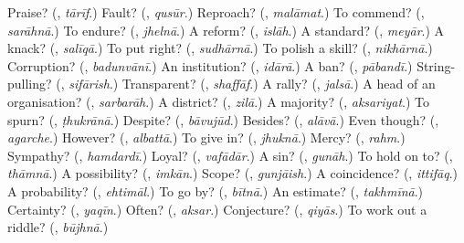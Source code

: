 \begin{tcolorbox}[breakable,colback=teal!4,colframe=teal!35!black,title={Before you move on}]
Praise? (\textbf{}, \emph{tārīf}.) Fault? (\textbf{}, \emph{qusūr}.) Reproach? (\textbf{}, \emph{malāmat}.) To commend? (\textbf{}, \emph{sarāhnā}.) To endure? (\textbf{}, \emph{jhelnā}.) A reform? (\textbf{}, \emph{islāh}.) A standard? (\textbf{}, \emph{meyār}.) A knack? (\textbf{}, \emph{salīqā}.) To put right? (\textbf{}, \emph{sudhārnā}.) To polish a skill? (\textbf{}, \emph{nikhārnā}.) Corruption? (\textbf{}, \emph{badunvānī}.) An institution? (\textbf{}, \emph{idārā}.) A ban? (\textbf{}, \emph{pābandī}.) String-pulling? (\textbf{}, \emph{sifārish}.) Transparent? (\textbf{}, \emph{shaffāf}.) A rally? (\textbf{}, \emph{jalsā}.) A head of an organisation? (\textbf{}, \emph{sarbarāh}.) A district? (\textbf{}, \emph{zilā}.) A majority? (\textbf{}, \emph{aksariyat}.) To spurn? (\textbf{}, \emph{ṭhukrānā}.) Despite? (\textbf{}, \emph{bāvujūd}.) Besides? (\textbf{}, \emph{alāvā}.) Even though? (\textbf{}, \emph{agarche}.) However? (\textbf{}, \emph{albattā}.) To give in? (\textbf{}, \emph{jhuknā}.) Mercy? (\textbf{}, \emph{rahm}.) Sympathy? (\textbf{}, \emph{hamdardī}.) Loyal? (\textbf{}, \emph{vafādār}.) A sin? (\textbf{}, \emph{gunāh}.) To hold on to? (\textbf{}, \emph{thāmnā}.) A possibility? (\textbf{}, \emph{imkān}.) Scope? (\textbf{}, \emph{gunjāish}.) A coincidence? (\textbf{}, \emph{ittifāq}.) A probability? (\textbf{}, \emph{ehtimāl}.) To go by? (\textbf{}, \emph{bītnā}.) An estimate? (\textbf{}, \emph{takhmīnā}.) Certainty? (\textbf{}, \emph{yaqīn}.) Often? (\textbf{}, \emph{aksar}.) Conjecture? (\textbf{}, \emph{qiyās}.) To work out a riddle? (\textbf{}, \emph{būjhnā}.)
\end{tcolorbox}
